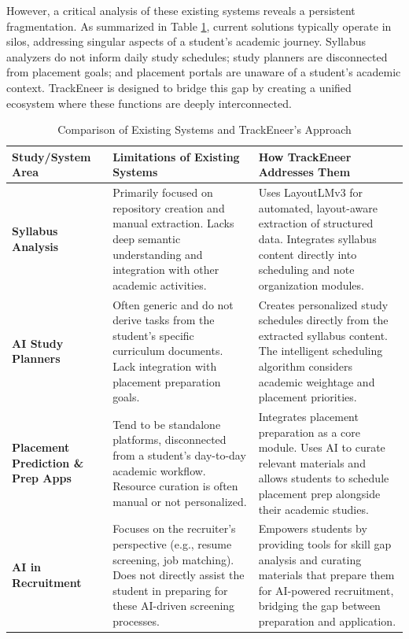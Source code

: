 \documentclass[conference]{IEEEtran}
\begin{document}
However, a critical analysis of these existing systems reveals a persistent fragmentation. As summarized in Table \ref{tab:lit_comparison}, current solutions typically operate in silos, addressing singular aspects of a student's academic journey. Syllabus analyzers do not inform daily study schedules; study planners are disconnected from placement goals; and placement portals are unaware of a student's academic context. TrackEneer is designed to bridge this gap by creating a unified ecosystem where these functions are deeply interconnected.

\begin{table}[htbp]
\caption{Comparison of Existing Systems and TrackEneer's Approach}
\begin{center}
\begin{tabular}{|p{3.5cm}|p{6cm}|p{6.5cm}|}
\hline
\textbf{Study/System Area} & \textbf{Limitations of Existing Systems} & \textbf{How TrackEneer Addresses Them} \\
\hline
\textbf{Syllabus Analysis} \cite{b1} & Primarily focused on repository creation and manual extraction. Lacks deep semantic understanding and integration with other academic activities. & Uses LayoutLMv3 for automated, layout-aware extraction of structured data. Integrates syllabus content directly into scheduling and note organization modules. \\
\hline
\textbf{AI Study Planners} \cite{b4} & Often generic and do not derive tasks from the student's specific curriculum documents. Lack integration with placement preparation goals. & Creates personalized study schedules directly from the extracted syllabus content. The intelligent scheduling algorithm considers academic weightage and placement priorities. \\
\hline
\textbf{Placement Prediction \& Prep Apps} \cite{b5, b8, b9} & Tend to be standalone platforms, disconnected from a student's day-to-day academic workflow. Resource curation is often manual or not personalized. & Integrates placement preparation as a core module. Uses AI to curate relevant materials and allows students to schedule placement prep alongside their academic studies. \\
\hline
\textbf{AI in Recruitment} \cite{b11, b12, b13} & Focuses on the recruiter's perspective (e.g., resume screening, job matching). Does not directly assist the student in preparing for these AI-driven screening processes. & Empowers students by providing tools for skill gap analysis and curating materials that prepare them for AI-powered recruitment, bridging the gap between preparation and application. \\
\hline
\end{tabular}
\label{tab:lit_comparison}
\end{center}
\end{table}
\end{document}
